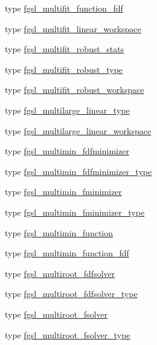 \begin{DoxyCompactItemize}
\item 
type \hyperlink{structfgsl_1_1fgsl__multifit__function__fdf}{fgsl\+\_\+multifit\+\_\+function\+\_\+fdf}
\item 
type \hyperlink{structfgsl_1_1fgsl__multifit__linear__workspace}{fgsl\+\_\+multifit\+\_\+linear\+\_\+workspace}
\item 
type \hyperlink{structfgsl_1_1fgsl__multifit__robust__stats}{fgsl\+\_\+multifit\+\_\+robust\+\_\+stats}
\item 
type \hyperlink{structfgsl_1_1fgsl__multifit__robust__type}{fgsl\+\_\+multifit\+\_\+robust\+\_\+type}
\item 
type \hyperlink{structfgsl_1_1fgsl__multifit__robust__workspace}{fgsl\+\_\+multifit\+\_\+robust\+\_\+workspace}
\item 
type \hyperlink{structfgsl_1_1fgsl__multilarge__linear__type}{fgsl\+\_\+multilarge\+\_\+linear\+\_\+type}
\item 
type \hyperlink{structfgsl_1_1fgsl__multilarge__linear__workspace}{fgsl\+\_\+multilarge\+\_\+linear\+\_\+workspace}
\item 
type \hyperlink{structfgsl_1_1fgsl__multimin__fdfminimizer}{fgsl\+\_\+multimin\+\_\+fdfminimizer}
\item 
type \hyperlink{structfgsl_1_1fgsl__multimin__fdfminimizer__type}{fgsl\+\_\+multimin\+\_\+fdfminimizer\+\_\+type}
\item 
type \hyperlink{structfgsl_1_1fgsl__multimin__fminimizer}{fgsl\+\_\+multimin\+\_\+fminimizer}
\item 
type \hyperlink{structfgsl_1_1fgsl__multimin__fminimizer__type}{fgsl\+\_\+multimin\+\_\+fminimizer\+\_\+type}
\item 
type \hyperlink{structfgsl_1_1fgsl__multimin__function}{fgsl\+\_\+multimin\+\_\+function}
\item 
type \hyperlink{structfgsl_1_1fgsl__multimin__function__fdf}{fgsl\+\_\+multimin\+\_\+function\+\_\+fdf}
\item 
type \hyperlink{structfgsl_1_1fgsl__multiroot__fdfsolver}{fgsl\+\_\+multiroot\+\_\+fdfsolver}
\item 
type \hyperlink{structfgsl_1_1fgsl__multiroot__fdfsolver__type}{fgsl\+\_\+multiroot\+\_\+fdfsolver\+\_\+type}
\item 
type \hyperlink{structfgsl_1_1fgsl__multiroot__fsolver}{fgsl\+\_\+multiroot\+\_\+fsolver}
\item 
type \hyperlink{structfgsl_1_1fgsl__multiroot__fsolver__type}{fgsl\+\_\+multiroot\+\_\+fsolver\+\_\+type}
\item 

\end{DoxyCompactItemize}
